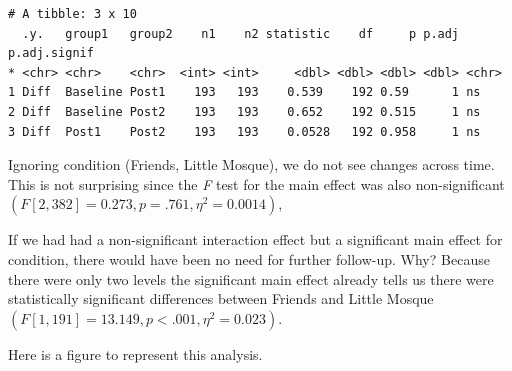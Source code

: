 \documentclass[
  11pt,
]{book}
\begin{document}
\begin{verbatim}
# A tibble: 3 x 10
  .y.   group1   group2    n1    n2 statistic    df     p p.adj p.adj.signif
* <chr> <chr>    <chr>  <int> <int>     <dbl> <dbl> <dbl> <dbl> <chr>       
1 Diff  Baseline Post1    193   193    0.539    192 0.59      1 ns          
2 Diff  Baseline Post2    193   193    0.652    192 0.515     1 ns          
3 Diff  Post1    Post2    193   193    0.0528   192 0.958     1 ns          
\end{verbatim}

Ignoring condition (Friends, Little Mosque), we do not see changes across time. This is not surprising since the \emph{F} test for the main effect was also non-significant \((F[2, 382] = 0.273, p = .761, \eta^{2} = 0.0014)\),

If we had had a non-significant interaction effect but a significant main effect for condition, there would have been no need for further follow-up. Why? Because there were only two levels the significant main effect already tells us there were statistically significant differences between Friends and Little Mosque \((F[1, 191] = 13.149, p < .001, \eta^{2} = 0.023)\).

Here is a figure to represent this analysis.
\end{document}
